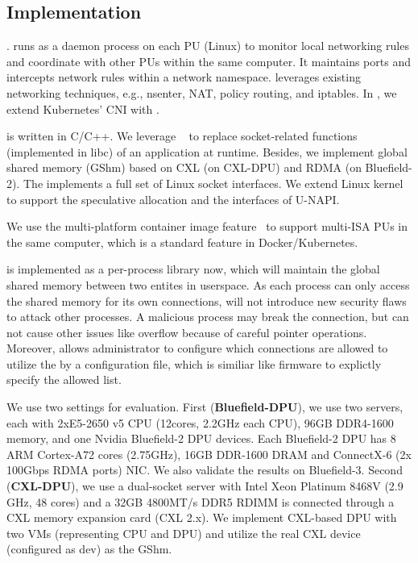 \subsection{Implementation}
\label{subs:imp}

\myparagraph{\giptable}.
\giptable runs as a daemon process on each PU (Linux) to monitor local networking rules and coordinate with other PUs within the same computer.
It maintains ports and intercepts network rules within a network namespace.
\giptable leverages existing networking techniques, e.g., nsenter, NAT, policy routing, and iptables.
In \sys, we extend Kubernetes' CNI with \giptable.

\gsocket is written in C/C++.
We leverage ~\cite{ld-preload} to replace socket-related functions (implemented in libc) of an application at runtime.
Besides, we implement global shared memory (GShm) based on CXL (on CXL-DPU) and RDMA (on Bluefield-2).
The \gsocket implements a full set of Linux socket interfaces. 
We extend Linux kernel to support the speculative allocation and the interfaces of U-NAPI.

We use the multi-platform container image feature~\cite{multi-platform} to support multi-ISA PUs in the same computer, which is a standard feature in Docker/Kubernetes.

\os is implemented as a per-process library now, which will maintain the global shared memory between two entites in userspace.
As each process can only access the shared memory for its own connections, \os will not introduce new security flaws to attack other processes.
A malicious process may break the connection, but can not cause other issues like overflow because of careful pointer operations.
Moreover, \os allows administrator to configure which connections are allowed to utilize the \gsocket by a configuration file, 
which is similiar like firmware to explictly specify the allowed list.



We use two settings for evaluation.
First (\textbf{Bluefield-DPU}), we use two servers, each with 2xE5-2650 v5 CPU (12cores, 2.2GHz each CPU), 96GB DDR4-1600 memory, and one Nvidia Bluefield-2 DPU devices.
Each Bluefield-2 DPU has 8 ARM Cortex-A72 cores (2.75GHz), 16GB DDR-1600 DRAM and ConnectX-6 (2x 100Gbps RDMA ports) NIC.
We also validate the results on Bluefield-3.
Second (\textbf{CXL-DPU}), 
we use a dual-socket server with Intel Xeon Platinum 8468V (2.9 GHz, 48 cores) and a 32GB 4800MT/s DDR5 RDIMM is connected through a CXL memory expansion card (CXL 2.x).
We implement CXL-based DPU with two VMs (representing CPU and DPU) and utilize the real CXL device (configured as  dev) as the GShm.

